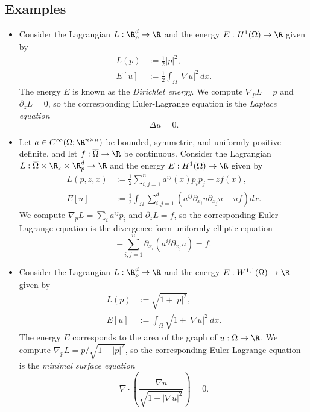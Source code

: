 \documentclass[reqno]{amsart}
\theoremstyle{definition}
\theoremstyle{remark}
\begin{document}
\subsection{Examples}
\label{subsec:example}
\begin{itemize}
	\item Consider the Lagrangian $L : \R^d_p \to \R$ and the energy $E : H^1 (\Omega) \to \R$ given by 
				\begin{align*}
					 L(p) 
					 	&:= \frac12 |p|^2, \\
					 E[u] 
					 	&:= \frac12 \int_\Omega |\nabla u|^2 \, dx. 
				\end{align*}	 	
			The energy $E$ is known as the \textit{Dirichlet energy}. We compute $\nabla_p L = p$ and $\partial_z L = 0$, so the corresponding Euler-Lagrange equation is the \textit{Laplace equation}
				\[ \Delta u = 0. \]
				
	\item Let $a \in C^\infty (\Omega ; \R^{n \times n})$ be bounded, symmetric, and uniformly positive definite, and let $f : \overline \Omega \to \R$ be continuous. Consider the Lagrangian $L : \overline \Omega \times \R_z \times \R^d_p \to \R$ and the energy $E : H^1 (\Omega) \to \R$ given by
					\begin{align*}
						 L(p, z, x)
						 	&:= \frac12 \sum_{i, j = 1}^n a^{ij} (x) p_i p_j - z f(x), \\
						 E[u] 
						 	&:= \frac12 \int_\Omega \sum_{i, j = 1}^d \left( a^{ij}  \partial_{x_i} u \partial_{x_j} u - u f \right) dx .
					\end{align*}	 	
				We compute $\nabla_p L = \sum_i a^{ij} p_i$ and $\partial_z L = f$, so the corresponding Euler-Lagrange equation is the divergence-form uniformly elliptic equation
					\[ - \sum_{i, j = 1}^n \partial_{x_i} \left( a^{ij} \partial_{x_j} u\right) = f.  \]		
					
	\item Consider the Lagrangian $L: \R^d_p \to \R$ and the energy $E: W^{1, 1} (\Omega) \to \R$ given by 
			\begin{align*}
				L(p) 
					&:= \sqrt{1 + |p|^2}, \\
				E[u] 
					&:= \int_\Omega \sqrt{1 + |\nabla u|^2}\,  dx .
			\end{align*}		
		The energy $E$ corresponds to the area of the graph of $u : \Omega \to \R$. We compute $\nabla_p L = p/\sqrt{1 + |p|^2}$, so the corresponding Euler-Lagrange equation is the \textit{minimal surface equation}
			\[ \nabla \cdot \left( \frac{\nabla u}{\sqrt{1 + |\nabla u|^2}} \right) = 0. \]
	

\end{itemize}
\end{document}
